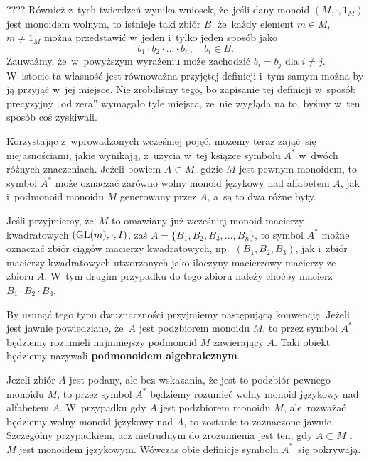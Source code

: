 \documentclass[a4paper,11pt]{article}
\begin{document}
???? Również z~tych twierdzeń wynika wniosek, że~jeśli dany monoid
$( M, \cdot, 1_{ M } )$ jest monoidem wolnym, to istnieje taki zbiór
$B$, że~każdy element $m \in M$, $m \neq 1_{ M }$ można przedstawić
w~jeden i~tylko jeden sposób jako
\begin{equation}
  \label{eq:Forys-Forys-04}
  b_{ 1 } \cdot b_{ 2 } \cdot \ldots \cdot b_{ n }, \quad
  b_{ i } \in B.
\end{equation}
Zauważmy, że~w~powyższym wyrażeniu może zachodzić $b_{ i } = b_{ j }$
dla $i \neq j$. W~istocie ta własność jest równoważna przyjętej
definicji i~tym samym można by ją przyjąć w~jej miejsce. Nie
zrobiliśmy tego, bo zapisanie tej definicji w~sposób precyzyjny „od
zera” wymagało tyle miejsca, że~nie wygląda na to, byśmy w~ten sposób
coś zyskiwali.

\vspace{\spaceFour}





\start {} Korzystając z~wprowadzonych wcześniej pojęć, możemy
teraz zająć~się niejasnościami, jakie wynikają, z~użycia w~tej książce
symbolu $A^{ * }$ w~dwóch różnych znaczeniach. Jeżeli bowiem
$A \subset M$, gdzie $M$ jest pewnym monoidem, to symbol $A^{ * }$
może oznaczać zarówno wolny monoid językowy nad alfabetem $A$, jak
i~podmonoid monoidu $M$ generowany przez $A$, a~są to dwa różne
byty.

Jeśli przyjmiemy, że~$M$ to omawiany już wcześniej monoid macierzy
kwadratowych $( \mathrm{GL}( m ), \cdot, I )$, zaś
$A = \{ B_{ 1 }, B_{ 2 }, B_{ 3 }, \ldots, B_{ n } \}$, to symbol
$A^{ * }$ możne oznaczać zbiór ciągów macierzy kwadratowych,
np.~$( B_{ 1 }, B_{ 2 }, B_{ 3 } )$, jak i~zbiór macierzy kwadratowych
utworzonych jako iloczyny macierzowy macierzy ze zbioru $A$. W~tym
drugim przypadku do tego zbioru należy choćby macierz
$B_{ 1 } \cdot B_{ 2 } \cdot B_{ 3 }$.

By usunąć tego typu dwuznaczności przyjmiemy następującą konwencję.
Jeżeli jest jawnie powiedziane, że~$A$ jest podzbiorem monoidu $M$, to
przez symbol $A^{ * }$ będziemy rozumieli najmniejszy podmonoid $M$
zawierający $A$. Taki obiekt będziemy nazywali \textbf{podmonoidem
  algebraicznym}.

Jeżeli zbiór $A$ jest podany, ale bez wskazania, że
jest to podzbiór pewnego monoidu $M$, to przez symbol $A^{ * }$
będziemy rozumieć wolny monoid językowy nad alfabetem $A$. W~przypadku
gdy $A$ jest podzbiorem monoidu $M$, ale~rozważać będziemy wolny
monoid językowy nad $A$, to zostanie to zaznaczone jawnie. Szczególny
przypadkiem, acz nietrudnym do zrozumienia jest ten, gdy $A \subset M$
i~$M$ jest monoidem językowym. Wówczas obie definicje symbolu
$A^{ * }$~się pokrywają.
\end{document}
